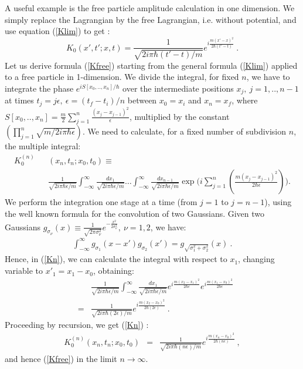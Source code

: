 \documentclass[12pt,aps,prb,preprint]{revtex4-1}   %
\begin{document}
A useful example is the free particle amplitude calculation in
one dimension. We simply replace the Lagrangian by the free
Lagrangian, i.e. without potential, and use equation
(\ref{Klim}) to get :
\begin{equation}\label{Kfree}
K_0(x',t';x,t)=\frac{1}{\sqrt{2i\pi \hbar(t'-t)/m}}
e^{i\frac{m(x'-x)^2}{2\hbar (t'-t)}}\ .
\end{equation}
Let us derive formula (\ref{Kfree}) starting from the general formula (\ref{Klim})
applied to a free particle in 1-dimension.
We divide the integral, for fixed $n$, we have to integrate the phase $e^{i S[x_0,..,x_n]/\hbar}$
over the intermediate positions $x_j,\ j=1,..,n-1$ at times $t_j=j\epsilon,\ \epsilon=(t_f-t_i)/n$ 
between $x_0=x_i$ and $x_n=x_f$, where $S[x_0,..,x_n]=\frac{m}{2}\sum_{j=1}^n\frac{(x_j-x_{j-1})^2}{\epsilon}$,
multiplied by the constant $\left(\prod_{j=1}^{n}\sqrt{m/2i\pi\hbar\epsilon}\right)$. 
We need to calculate, for a fixed number of subdivision $n$,
the multiple integral:
\begin{eqnarray}\label{Kn}
K_0^{(n)}&&(x_n,t_n;x_0,t_0)\equiv
{}\nonumber{}\\{}&&\frac{1}{\sqrt{2i\pi \hbar\epsilon/m}}\int_{-\infty}^{\infty}
\frac{dx_1}{\sqrt{2i\pi \hbar\epsilon/m}}
\ldots\int_{-\infty}^{\infty}\frac{dx_{n-1}}{\sqrt{2i\pi \hbar\epsilon/m}}
\exp{\bigl(i\sum_{j=1}^{n}(\frac{m(x_{j}-x_{j-1})^2}{2\hbar\epsilon})
\bigr)}.
\end{eqnarray}
We perform the integration one stage at a time (from $j=1$ to $j=n-1$),
using the well known formula for the convolution of two Gaussians.
Given two Gaussians $g_{\sigma_\nu}(x)\equiv\frac{1}{\sqrt{2\pi\sigma_\nu^2}}
e^{-\frac{x^2}{2\sigma_\nu^2}},\ \nu=1,2$, we have:
\begin{eqnarray}\label{GaussianConvo}
\int_{-\infty}^{\infty}g_{\sigma_1}(x-x')g_{\sigma_2}(x')=g_{\sqrt{\sigma_1^2+\sigma_2^2}}(x)\ . 
\end{eqnarray}
Hence, in (\ref{Kn}), we can calculate the integral with respect to $x_1$,
changing variable to $x'_1=x_1-x_0$, obtaining:
\begin{eqnarray*}
&&\frac{1}{\sqrt{2i\pi \hbar\epsilon/m}}\int_{-\infty}^{\infty}\frac{dx_1}{\sqrt{2i\pi \hbar\epsilon/m}}
e^{i\frac{m(x_{2}-x_{1})^2}{2\hbar\epsilon}}e^{i\frac{m(x_{1}-x_0)^2}{2\hbar\epsilon}}
{}\\{}&=&\frac{1}{\sqrt{2i\pi \hbar(2\epsilon)/m}}e^{i\frac{m(x_{2}-x_0)^2}{2\hbar(2\epsilon)}}\ .
\end{eqnarray*}
Proceeding by recursion, we get (\ref{Kn}) :
\begin{eqnarray*}
K_0^{(n)}(x_n,t_n;x_0,t_0)&=&\frac{1}{\sqrt{2i\pi \hbar(n\epsilon)/m}}e^{i\frac{m(x_{n}-x_0)^2}{2\hbar(n\epsilon)}}\ ,
\end{eqnarray*}
and hence (\ref{Kfree}) in the limit $n\rightarrow\infty$.
\end{document}
